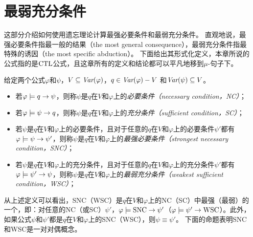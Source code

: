 \section{最弱充分条件}
\label{chapter04:sec:snc}
这部分介绍如何使用遗忘理论计算最强必要条件和最弱充分条件。
直观地说，最强必要条件指最一般的结果（the most general consequence），最弱充分条件指最特殊的诱因（the most specific abduction）。
下面给出其形式化定义，本章所说的公式指的是$\textrm{CTL}$公式，且这章所有的定义和结论都可以平凡地移到$\mu$-句子下。
\begin{definition}[充分和必要条件]\label{def:NC:SC}
	给定两个公式$\varphi$和$\psi$，$V \subseteq \textit{Var}(\varphi)$，$q\in\textit{Var}(\varphi)- V$
	和$\textit{Var}(\psi)\subseteq V$。
	\begin{itemize}
		\item 若$\varphi \models q \rightarrow \psi$，则称$\psi$是$q$在$V$和$\varphi$上的{\em 必要条件（necessary condition，NC）}；
		\item 若$\varphi \models \psi\rightarrow q$，则称$\psi$是$q$在$V$和$\varphi$上的{\em 充分条件（sufficient condition，SC）}；
		\item 若$\psi$是$q$在$V$和$\varphi$上的必要条件，且对于任意的$q$在$V$和$\varphi$上的必要条件$\psi'$都有$\varphi\models\psi\rightarrow\psi'$，则称$\psi$是$q$在$V$和$\varphi$上的{\em 最强必要条件（strongest necessary condition，SNC）}；
		\item 若$\psi$是$q$在$V$和$\varphi$上的充分条件，且对于任意的$q$在$V$和$\varphi$上的充分条件$\psi'$都有$\varphi\models\psi'\rightarrow\psi$，则称$\psi$是$q$在$V$和$\varphi$上的{\em 最弱充分条件（weakest sufficient condition，WSC）}；
	\end{itemize}
\end{definition}

从上述定义可以看出，SNC（WSC）是$q$在$V$和$\varphi$上的NC（SC）中最强（最弱）的一个，即：对任意的NC（或SC）$\psi'$，$\varphi \models \hbox{SNC} \rightarrow \psi'$（$\varphi \models \psi' \rightarrow \hbox{WSC}$）。此外，如果公式$\psi$和$\psi'$都是$q$在$V$和$\varphi$上的SNC（WSC），则$\psi \equiv \psi'$。
下面的命题表明SNC和WSC是一对对偶概念。

